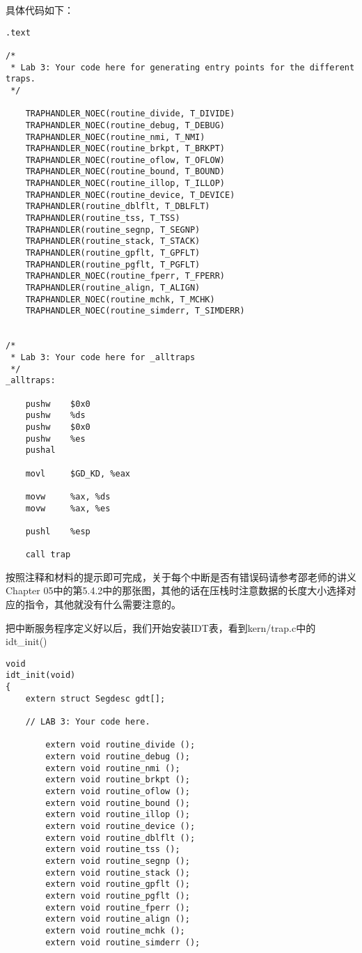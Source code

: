 \documentclass{article}
\newcommand{\funcname}[1]{{\ttfamily \small #1}}
\begin{document}
\begin{CJK*}{UTF8}{gkai}
具体代码如下：

\begin{lstlisting}[style=acode, title={\scriptsize \ttfamily \bfseries kern/trapentry.S}]
.text

/*
 * Lab 3: Your code here for generating entry points for the different traps.
 */

    TRAPHANDLER_NOEC(routine_divide, T_DIVIDE)
    TRAPHANDLER_NOEC(routine_debug, T_DEBUG)
    TRAPHANDLER_NOEC(routine_nmi, T_NMI)
    TRAPHANDLER_NOEC(routine_brkpt, T_BRKPT)
    TRAPHANDLER_NOEC(routine_oflow, T_OFLOW)
    TRAPHANDLER_NOEC(routine_bound, T_BOUND)
    TRAPHANDLER_NOEC(routine_illop, T_ILLOP)
    TRAPHANDLER_NOEC(routine_device, T_DEVICE)
    TRAPHANDLER(routine_dblflt, T_DBLFLT)
    TRAPHANDLER(routine_tss, T_TSS)
    TRAPHANDLER(routine_segnp, T_SEGNP)
    TRAPHANDLER(routine_stack, T_STACK)
    TRAPHANDLER(routine_gpflt, T_GPFLT)
    TRAPHANDLER(routine_pgflt, T_PGFLT)
    TRAPHANDLER_NOEC(routine_fperr, T_FPERR)
    TRAPHANDLER(routine_align, T_ALIGN)
    TRAPHANDLER_NOEC(routine_mchk, T_MCHK)
    TRAPHANDLER_NOEC(routine_simderr, T_SIMDERR)


/*
 * Lab 3: Your code here for _alltraps
 */
_alltraps:

    pushw    $0x0
    pushw    %ds
    pushw    $0x0
    pushw    %es
    pushal

    movl     $GD_KD, %eax
    
    movw     %ax, %ds
    movw     %ax, %es

    pushl    %esp

    call trap
\end{lstlisting}

按照注释和材料的提示即可完成，关于每个中断是否有错误码请参考邵老师的讲义Chapter 05中的第5.4.2中的那张图，其他的话在压栈时注意数据的长度大小选择对应的指令，其他就没有什么需要注意的。

把中断服务程序定义好以后，我们开始安装IDT表，看到kern/trap.c中的\funcname{idt\_init()}

\begin{lstlisting}[style=ccode, title={\scriptsize \ttfamily \bfseries kern/trap.c: idt\_init()}]
void
idt_init(void)
{
	extern struct Segdesc gdt[];
	
	// LAB 3: Your code here.

        extern void routine_divide ();
        extern void routine_debug ();
        extern void routine_nmi ();
        extern void routine_brkpt ();
        extern void routine_oflow ();
        extern void routine_bound ();
        extern void routine_illop ();
        extern void routine_device ();
        extern void routine_dblflt ();
        extern void routine_tss ();
        extern void routine_segnp ();
        extern void routine_stack ();
        extern void routine_gpflt ();
        extern void routine_pgflt ();
        extern void routine_fperr ();
        extern void routine_align ();
        extern void routine_mchk ();
        extern void routine_simderr ();



\end{lstlisting}
\end{CJK*}
\end{document}
